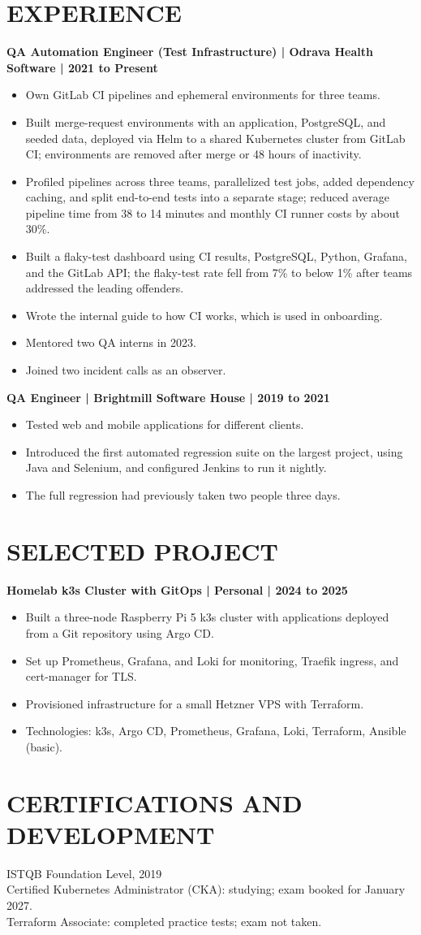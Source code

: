 \documentclass[11pt,a4paper]{article}
\begin{document}
\section*{EXPERIENCE}
\textbf{QA Automation Engineer (Test Infrastructure) | Odrava Health Software | 2021 to Present}
\begin{itemize}
\item Own GitLab CI pipelines and ephemeral environments for three teams.
\item Built merge-request environments with an application, PostgreSQL, and seeded data, deployed via Helm to a shared Kubernetes cluster from GitLab CI; environments are removed after merge or 48 hours of inactivity.
\item Profiled pipelines across three teams, parallelized test jobs, added dependency caching, and split end-to-end tests into a separate stage; reduced average pipeline time from 38 to 14 minutes and monthly CI runner costs by about 30\%.
\item Built a flaky-test dashboard using CI results, PostgreSQL, Python, Grafana, and the GitLab API; the flaky-test rate fell from 7\% to below 1\% after teams addressed the leading offenders.
\item Wrote the internal guide to how CI works, which is used in onboarding.
\item Mentored two QA interns in 2023.
\item Joined two incident calls as an observer.
\end{itemize}

\textbf{QA Engineer | Brightmill Software House | 2019 to 2021}
\begin{itemize}
\item Tested web and mobile applications for different clients.
\item Introduced the first automated regression suite on the largest project, using Java and Selenium, and configured Jenkins to run it nightly.
\item The full regression had previously taken two people three days.
\end{itemize}

\section*{SELECTED PROJECT}
\textbf{Homelab k3s Cluster with GitOps | Personal | 2024 to 2025}
\begin{itemize}
\item Built a three-node Raspberry Pi 5 k3s cluster with applications deployed from a Git repository using Argo CD.
\item Set up Prometheus, Grafana, and Loki for monitoring, Traefik ingress, and cert-manager for TLS.
\item Provisioned infrastructure for a small Hetzner VPS with Terraform.
\item Technologies: k3s, Argo CD, Prometheus, Grafana, Loki, Terraform, Ansible (basic).
\end{itemize}

\section*{CERTIFICATIONS AND DEVELOPMENT}
ISTQB Foundation Level, 2019\\
Certified Kubernetes Administrator (CKA): studying; exam booked for January 2027.\\
Terraform Associate: completed practice tests; exam not taken.
\end{document}
